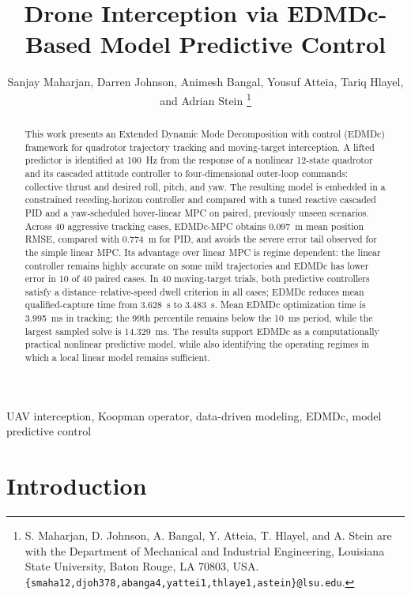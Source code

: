 \documentclass[letterpaper,10pt,conference]{ieeeconf}
\begin{document}
\title{Drone Interception via EDMDc-Based Model Predictive Control}

\author{Sanjay Maharjan, Darren Johnson, Animesh Bangal, Yousuf Atteia,
Tariq Hlayel, and Adrian Stein%
\thanks{S. Maharjan, D. Johnson, A. Bangal, Y. Atteia, T. Hlayel, and
A. Stein are with the Department of Mechanical and Industrial Engineering,
Louisiana State University, Baton Rouge, LA 70803, USA.
{\tt\small \{smaha12,djoh378,abanga4,yattei1,thlaye1,astein\}@lsu.edu}.}}

\maketitle

\begin{abstract}
This work presents an Extended Dynamic Mode Decomposition with control
(EDMDc) framework for quadrotor trajectory tracking and moving-target
interception. A lifted predictor is identified at 100~Hz from the response of
a nonlinear 12-state quadrotor and its cascaded attitude controller to
four-dimensional outer-loop commands: collective thrust and desired
roll, pitch, and yaw. The resulting model is embedded in a constrained
receding-horizon controller and compared with a tuned reactive cascaded PID
and a yaw-scheduled hover-linear MPC on paired, previously unseen scenarios.
Across 40 aggressive tracking cases, EDMDc-MPC obtains 0.097~m mean position
RMSE, compared with 0.774~m for PID, and avoids the severe error tail observed
for the simple linear MPC. Its advantage over linear MPC is regime dependent:
the linear controller remains highly accurate on some mild trajectories and
EDMDc has lower error in 10 of 40 paired cases. In 40 moving-target trials,
both predictive controllers satisfy a distance--relative-speed dwell
criterion in all cases; EDMDc reduces mean qualified-capture time from
3.628~s to 3.483~s. Mean EDMDc optimization time is 3.995~ms in tracking;
the 99th percentile remains below the 10~ms period, while the largest sampled
solve is 14.329~ms. The results support EDMDc as a
computationally practical nonlinear predictive model, while also identifying
the operating regimes in which a local linear model remains sufficient.
\end{abstract}

\begin{keywords}
UAV interception, Koopman operator, data-driven modeling, EDMDc, model
predictive control
\end{keywords}

\section{Introduction}
\end{document}
